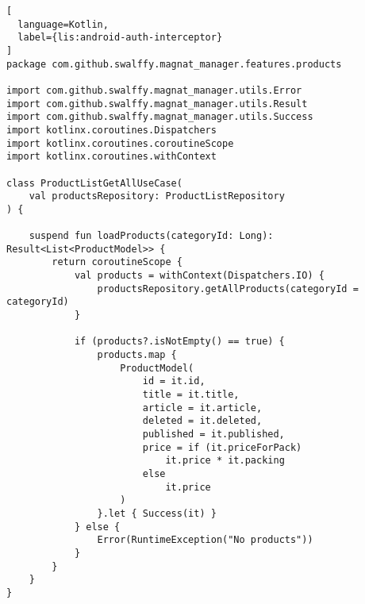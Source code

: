 \begin{lstlisting}[
  language=Kotlin,
  label={lis:android-auth-interceptor}
]
package com.github.swalffy.magnat_manager.features.products

import com.github.swalffy.magnat_manager.utils.Error
import com.github.swalffy.magnat_manager.utils.Result
import com.github.swalffy.magnat_manager.utils.Success
import kotlinx.coroutines.Dispatchers
import kotlinx.coroutines.coroutineScope
import kotlinx.coroutines.withContext

class ProductListGetAllUseCase(
    val productsRepository: ProductListRepository
) {

    suspend fun loadProducts(categoryId: Long): Result<List<ProductModel>> {
        return coroutineScope {
            val products = withContext(Dispatchers.IO) {
                productsRepository.getAllProducts(categoryId = categoryId)
            }

            if (products?.isNotEmpty() == true) {
                products.map {
                    ProductModel(
                        id = it.id,
                        title = it.title,
                        article = it.article,
                        deleted = it.deleted,
                        published = it.published,
                        price = if (it.priceForPack)
                            it.price * it.packing
                        else
                            it.price
                    )
                }.let { Success(it) }
            } else {
                Error(RuntimeException("No products"))
            }
        }
    }
}
\end{lstlisting}